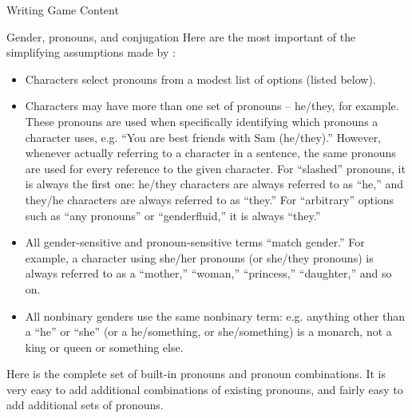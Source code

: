 \documentclass[sheet]{GameTexBase}
\begin{document}
\begin{section}{Writing Game Content}
\begin{subsection}{Gender, pronouns, and conjugation}
Here are the most important of the simplifying assumptions made by \gametex{}:

\begin{itemize}
\item Characters select pronouns from a modest list of options (listed below).
\item Characters may have more than one set of pronouns -- he/they, for example.  These pronouns are used when specifically identifying which pronouns a character uses, e.g. ``You are best friends with Sam (he/they).'' However, whenever actually referring to a character in a sentence, the same pronouns are used for every reference to the given character.  For ``slashed'' pronouns, it is always the first one: he/they characters are always referred to as ``he,'' and they/he characters are always referred to as ``they.''  For ``arbitrary'' options such as ``any pronouns'' or ``genderfluid,'' it is always ``they.''
\item All gender-sensitive and pronoun-sensitive terms ``match gender.''  For example, a character using she/her pronouns (or she/they pronouns) is always referred to as a ``mother,'' ``woman,'' ``princess,'' ``daughter,'' and so on.
\item All nonbinary genders use the same nonbinary term: e.g. anything other than a ``he'' or ``she'' (or a he/something, or she/something) is a monarch, not a king or queen or something else.
\end{itemize}

Here is the complete set of built-in pronouns and pronoun combinations.  It is very easy to add additional combinations of existing pronouns, and fairly easy to add additional sets of pronouns.


\end{subsection}
\end{section}
\end{document}

